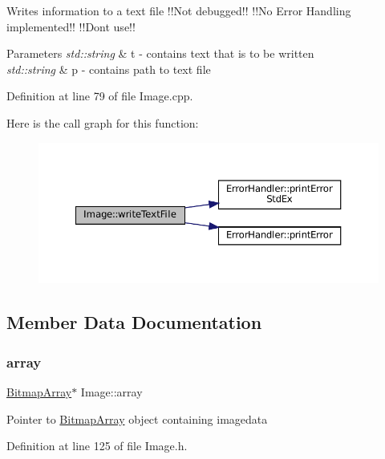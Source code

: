 Writes information to a text file !!\+Not debugged!! !!\+No Error Handling implemented!! !!\+Dont use!! 


\begin{DoxyParams}{Parameters}
{\em std\+::string} & t -\/ contains text that is to be written \\
\hline
{\em std\+::string} & p -\/ contains path to text file \\
\hline
\end{DoxyParams}


Definition at line 79 of file Image.\+cpp.

Here is the call graph for this function\+:\nopagebreak
\begin{figure}[H]
\begin{center}
\leavevmode
\includegraphics[width=350pt]{classImage_a2dc30c9d6280b8c0edd2f4f0ab474a5c_cgraph}
\end{center}
\end{figure}


\subsection{Member Data Documentation}
\mbox{\label{classImage_a1c18dd7d9eda416d44e7eb408d5b3c38}} 
\subsubsection{\texorpdfstring{array}{array}}
{\footnotesize\ttfamily \mbox{\hyperlink{classBitmapArray}{Bitmap\+Array}}$\ast$ Image\+::array\hspace{0.3cm}{\ttfamily [protected]}}

Pointer to \mbox{\hyperlink{classBitmapArray}{Bitmap\+Array}} object containing imagedata 

Definition at line 125 of file Image.\+h.

\mbox{\label{classImage_a560753c20e67a544be57bba971021375}} 
